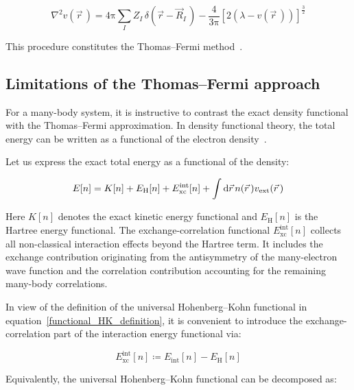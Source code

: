 \begin{equation}
    \nabla^2 v(\vec{r}\,)=4\mathrm{\pi}\sum_I Z_I\,\delta\left(\vec{r}-\vec{R}_I\,\right)-\frac{4}{3\mathrm{\pi}}\left[2\left(\lambda-v(\vec{r}\,)\right)\right]^{\frac{3}{2}}
\label{differential_form_Thomas_Fermi_equation}
\end{equation}

This procedure constitutes the Thomas--Fermi method~\cite{lieb2010stability}.

\subsection{Limitations of the Thomas--Fermi approach}

For a many-body system,
it is instructive to contrast the exact density functional with the Thomas--Fermi approximation.
In density functional theory, the total energy can be written as a functional of the electron density~\cite{hohenberg1964inhomogeneous,jones2015density}.

Let us express the exact total energy as a functional of the density:

\begin{equation}
    E[n]=K[n]+E_\mathrm{H}[n]+E_\mathrm{xc}^\mathrm{int}[n]+\int\mathrm{d}{\vec{r}}\,n(\vec{r}\,)v_\mathrm{ext}(\vec{r}\,)
\label{functional_exact_total_energy}
\end{equation}

Here $K[n]$ denotes the exact kinetic energy functional and $E_\mathrm{H}[n]$ is the Hartree energy functional.
The exchange-correlation functional $E_\mathrm{xc}^\mathrm{int}[n]$ collects all non-classical interaction effects beyond the Hartree term.
It includes the exchange contribution originating from the antisymmetry of the many-electron wave function and the correlation contribution accounting for the remaining many-body correlations.

In view of the definition of the universal Hohenberg--Kohn functional in equation~\eqref{functional_HK_definition},
it is convenient to introduce the exchange-correlation part of the interaction energy functional via:

\begin{equation}
E_\mathrm{xc}^{\mathrm{int}}[n]\coloneqq E_\mathrm{int}[n]-E_\mathrm{H}[n]
\label{Exc_int_definition}
\end{equation}

Equivalently, the universal Hohenberg--Kohn functional can be decomposed as:

